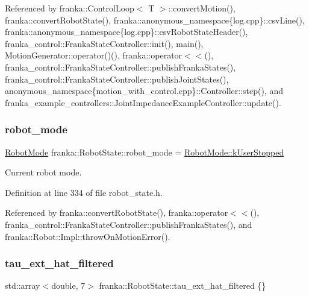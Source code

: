 Referenced by franka\+::\+Control\+Loop$<$ T $>$\+::convert\+Motion(), franka\+::convert\+Robot\+State(), franka\+::anonymous\+\_\+namespace\{log.\+cpp\}\+::csv\+Line(), franka\+::anonymous\+\_\+namespace\{log.\+cpp\}\+::csv\+Robot\+State\+Header(), franka\+\_\+control\+::\+Franka\+State\+Controller\+::init(), main(), Motion\+Generator\+::operator()(), franka\+::operator$<$$<$(), franka\+\_\+control\+::\+Franka\+State\+Controller\+::publish\+Franka\+States(), franka\+\_\+control\+::\+Franka\+State\+Controller\+::publish\+Joint\+States(), anonymous\+\_\+namespace\{motion\+\_\+with\+\_\+control.\+cpp\}\+::\+Controller\+::step(), and franka\+\_\+example\+\_\+controllers\+::\+Joint\+Impedance\+Example\+Controller\+::update().

\mbox{\label{structfranka_1_1RobotState_a4943ae75e0e2ec534e0afac31cbcc987}} 
\subsubsection{\texorpdfstring{robot\+\_\+mode}{robot\_mode}}
{\footnotesize\ttfamily \hyperlink{namespacefranka_adfe059ae23ebbad59e421edaa879651a}{Robot\+Mode} franka\+::\+Robot\+State\+::robot\+\_\+mode = \hyperlink{namespacefranka_adfe059ae23ebbad59e421edaa879651aaaef321f1c9c879b98c2bcd307ad2305f}{Robot\+Mode\+::k\+User\+Stopped}}

Current robot mode. 

Definition at line 334 of file robot\+\_\+state.\+h.



Referenced by franka\+::convert\+Robot\+State(), franka\+::operator$<$$<$(), franka\+\_\+control\+::\+Franka\+State\+Controller\+::publish\+Franka\+States(), and franka\+::\+Robot\+::\+Impl\+::throw\+On\+Motion\+Error().

\mbox{\label{structfranka_1_1RobotState_acdef8005828d193e45b128085a9e363b}} 
\subsubsection{\texorpdfstring{tau\+\_\+ext\+\_\+hat\+\_\+filtered}{tau\_ext\_hat\_filtered}}
{\footnotesize\ttfamily std\+::array$<$double, 7$>$ franka\+::\+Robot\+State\+::tau\+\_\+ext\+\_\+hat\+\_\+filtered \{\}}

